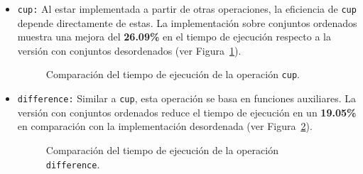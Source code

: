 \begin{itemize}
\begin{itemize}
        \item \texttt{cup:} 
        Al estar implementada a partir de otras operaciones, la eficiencia de \texttt{cup} depende directamente de estas. La implementación sobre conjuntos ordenados muestra una mejora del \textbf{26{.}09\%} en el tiempo de ejecución respecto a la versión con conjuntos desordenados (ver Figura~\ref{fig:Ren-cup}).

        \begin{figure}[htbp]
          \centering
          \caption{Comparación del tiempo de ejecución de la operación \texttt{cup}.}
          \label{fig:Ren-cup}
        \end{figure}

        \item \texttt{difference:} 
        Similar a \texttt{cup}, esta operación se basa en funciones auxiliares. La versión con conjuntos ordenados reduce el tiempo de ejecución en un \textbf{19{.}05\%} en comparación con la implementación desordenada (ver Figura~\ref{fig:Ren-dif}).

        \begin{figure}[htbp]
          \centering
          \caption{Comparación del tiempo de ejecución de la operación \texttt{difference}.}
          \label{fig:Ren-dif}
        \end{figure}
    \end{itemize}


\end{itemize}
